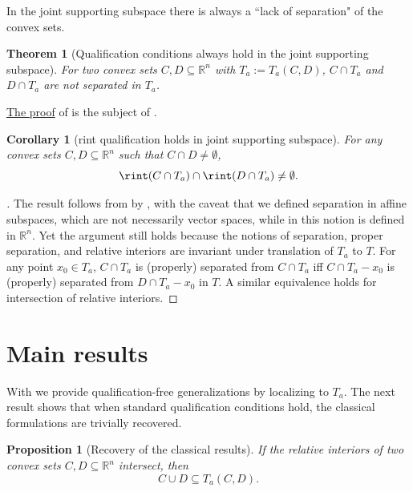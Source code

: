 \documentclass{article}
\theoremstyle{plain}
\newtheorem{theorem}{Theorem}[section]
\newtheorem{corollary}{Corollary}[section]
\newtheorem{proposition}{Proposition}[section]
\theoremstyle{definition}
\theoremstyle{remark}
\begin{document}
In the joint supporting subspace there is always a ``lack of separation"
of the convex sets.
\begin{theorem}[Qualification conditions always hold in the joint supporting subspace]
\label{loc:qualification_conditions_always_hold_in_the_joint_supporting_subspace.statement}
For two convex sets $C, D \subseteq \mathbb{R}^n$ with $T_a := T_a(C, D)$,
$C \cap T_a$ and $D \cap T_a$ are not separated
in $T_a$.
\end{theorem}
\hyperlink{loc:qualification_conditions_always_hold_in_the_joint_supporting_subspace.proof}{The proof} of  is the subject of .
\begin{corollary}[rint qualification holds in joint supporting subspace]
\label{loc:rint_qualification_holds_in_joint_supporting_subspace.statement}
For any convex sets $C, D \subseteq \mathbb{R}^n$ such that $C \cap D \neq \emptyset$,
\begin{equation*}
\rint (C \cap T_a)  \cap \rint (D \cap T_a) \neq \emptyset.
\end{equation*}
\end{corollary}
\begin{proof}[\hypertarget{loc:rint_qualification_holds_in_joint_supporting_subspace.proof}Proof of \Cref{loc:rint_qualification_holds_in_joint_supporting_subspace.statement}]

The result follows from 
by , with the caveat that we defined separation in affine subspaces,
which are not necessarily vector spaces,
while in \cite[theorem 11.3]{rockafellarConvexAnalysis1970} this notion
is defined in $\mathbb{R}^n$. Yet the argument still holds because
the notions of separation, proper separation, and relative interiors
are invariant under translation of $T_a$ to $T$.
For any point $x_0 \in T_a$, $C \cap T_a$ is (properly) separated from 
$C \cap T_a$ iff $C \cap T_a - x_0$ is (properly) separated
from $D \cap T_a - x_0$ in $T$. A similar equivalence holds for intersection
of relative interiors.
\end{proof}
\section{Main results}
\label{loc:body.main_results}
With 
we provide qualification-free generalizations 
by localizing to $T_a$.
The next result shows that when standard qualification conditions hold,
the classical formulations are trivially recovered.
\begin{proposition}[Recovery of the classical results]
\label{loc:recovery_of_the_classical_results.statement}
If the relative interiors
of two convex sets $C, D \subseteq \mathbb{R}^n$
intersect, then
\begin{equation*}
C \cup D \subseteq T_a(C, D).
\end{equation*}
\end{proposition}
\end{document}
